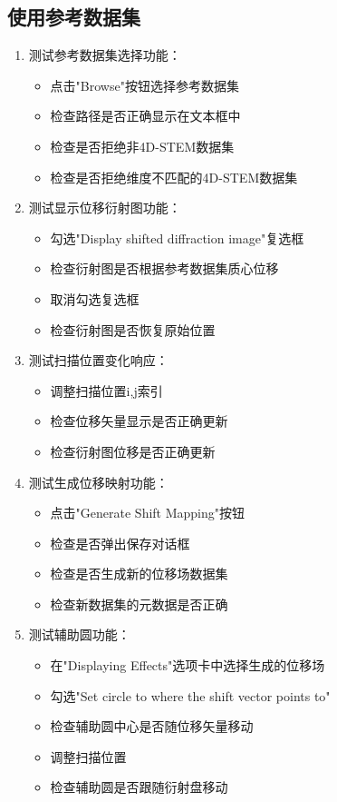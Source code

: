 \documentclass[a4paper,12pt]{report}	%
\begin{document}
\subsection{使用参考数据集}

\begin{enumerate}
    \item 测试参考数据集选择功能：
    \begin{itemize}
        \item 点击"Browse"按钮选择参考数据集
        \item 检查路径是否正确显示在文本框中
        \item 检查是否拒绝非4D-STEM数据集
        \item 检查是否拒绝维度不匹配的4D-STEM数据集
    \end{itemize}

    \item 测试显示位移衍射图功能：
    \begin{itemize}
        \item 勾选"Display shifted diffraction image"复选框
        \item 检查衍射图是否根据参考数据集质心位移
        \item 取消勾选复选框
        \item 检查衍射图是否恢复原始位置
    \end{itemize}

    \item 测试扫描位置变化响应：
    \begin{itemize}
        \item 调整扫描位置i,j索引
        \item 检查位移矢量显示是否正确更新
        \item 检查衍射图位移是否正确更新
    \end{itemize}

    \item 测试生成位移映射功能：
    \begin{itemize}
        \item 点击"Generate Shift Mapping"按钮
        \item 检查是否弹出保存对话框
        \item 检查是否生成新的位移场数据集
        \item 检查新数据集的元数据是否正确
    \end{itemize}

    \item 测试辅助圆功能：
    \begin{itemize}
        \item 在"Displaying Effects"选项卡中选择生成的位移场
        \item 勾选"Set circle to where the shift vector points to"
        \item 检查辅助圆中心是否随位移矢量移动
        \item 调整扫描位置
        \item 检查辅助圆是否跟随衍射盘移动
    \end{itemize}


\end{enumerate}
\end{document}
